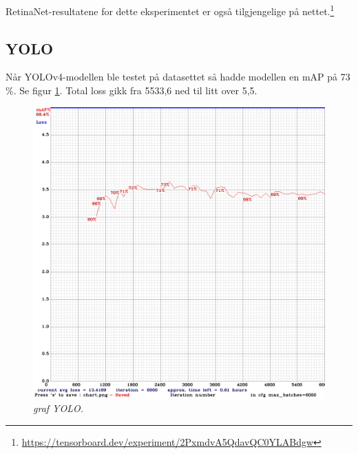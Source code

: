RetinaNet-resultatene for dette eksperimentet er også tilgjengelige på nettet.\footnote{\url{https://tensorboard.dev/experiment/2PxmdvA5QdavQC0YLABdgw}}

\subsection{YOLO}

Når YOLOv4-modellen ble testet på datasettet så hadde modellen en mAP på 73 \%. Se figur \ref{fig:chart_yolo}. Total loss gikk fra 5533,6 ned til litt over 5,5. %


\begin{figure}[h!]
\begin{center} 
\includegraphics[scale=0.35]{figures/chart_yolo-obj.png}
\caption{\small \sl graf YOLO. \label{fig:chart_yolo}}
\end{center}
\end{figure}